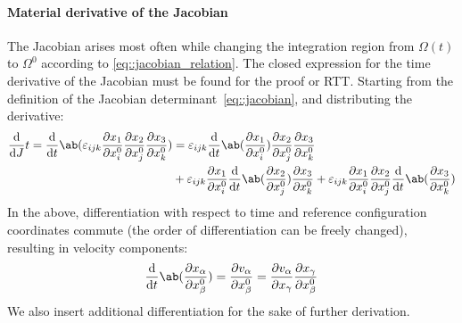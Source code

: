 \documentclass[justified, nobib,a4paper]{tufte-handout}
\begin{document}
\paragraph{Material derivative of the Jacobian}
The Jacobian arises most often while changing the integration region 
from \(\Omega(t)\) to \(\Omega^0\) according to \autoref{eq::jacobian_relation}.
The closed expression for the time derivative of the Jacobian must be found 
for the proof or RTT.
Starting from the definition of the Jacobian determinant~\autoref{eq::jacobian},
and distributing the derivative:
\begin{align*}
  \odv{}{J}{t} = \odv{}{t} \ab(\levicivita{i}{j}{k} 
  \pdv{x_1}{x^0_i} \pdv{x_2}{x^0_j} \pdv{x_3}{x^0_k})
  &= \levicivita{i}{j}{k} \odv{}{t} \ab( \pdv{x_1}{x^0_i} ) 
    \pdv{x_2}{x^0_j} \pdv{x_3}{x^0_k} \\
  &+ \levicivita{i}{j}{k} \pdv{x_1}{x^0_i} 
    \odv{}{t} \ab( \pdv{x_2}{x^0_j})  \pdv{x_3}{x^0_k} 
  + \levicivita{i}{j}{k} \pdv{x_1}{x^0_i} 
    \pdv{x_2}{x^0_j} \odv{}{t} \ab( \pdv{x_3}{x^0_k} )  
\end{align*}
In the above, differentiation with respect to time and reference
configuration coordinates commute (the order of differentiation 
can be freely changed), resulting in velocity components:
\begin{equation*}
  \odv{}{t} \ab( \pdv{x_\alpha}{x^0_\beta} )
  = \pdv{v_\alpha}{x^0_\beta}
  = \pdv{v_\alpha}{x_\gamma} \pdv{x_\gamma}{x^0_\beta}
\end{equation*}
We also insert additional differentiation for the sake of 
further derivation.
\end{document}

